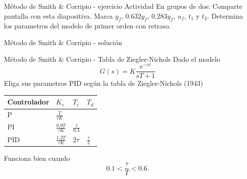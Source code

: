 \documentclass[presentation,aspectratio=1610]{beamer}
\begin{document}
\begin{frame}[label={sec:orgf203a01}]{Método de Smith \& Corripio - ejercicio}
\alert{Actividad} En grupos de dos: Comparte pantalla con esta diapositiva. Marca \(y_f\), \(0.632y_f\), \(0.283y_f\), \(u_f\), \(t_1\) y \(t_2\). Determina los parametros del modelo de primer orden con retraso.

\def\uampl{0.5}
\def\ttdelay{0.3}
\def\TTcnst{1.6}
\def\ggain{3}

\pgfmathsetmacro{\yfinal}{\uampl*\ggain}
\pgfmathsetmacro{\two}{\tdelay + \Tcnst}


\begin{center}
\end{center}
\end{frame}

\begin{frame}[label={sec:orgc81916a}]{Método de Smith \& Corripio - solución}
\end{frame}
\begin{frame}[label={sec:org71852b3}]{Método de Smith \& Corripio - Tabla de Ziegler-Nichols}
Dado el modelo 
\[ G(s) = K \frac{\mathrm{e}^{-s\tau}}{sT + 1} \]
Eliga sus parametros PID según la tabla de Ziegler-Nichols (1943)
   \begin{center}
   \setlength{\tabcolsep}{20pt}
   \renewcommand{\arraystretch}{1.5}
   \begin{tabular}{llll}
   Controlador & \(K_c\) & \(T_i\) & \(T_d\)\\
  \hline\hline
  P & \(\frac{T}{\tau K}\) &  & \\
  PI & \(\frac{0.9T}{\tau K}\) & \(\frac{\tau}{0.3}\) & \\
  PID & \(\frac{1.2T}{\tau K}\) & \(2\tau\) & \(\frac{\tau}{2}\)\\
  \hline
\end{tabular}
\end{center}

Funciona bien cuando \[0.1 < \frac{\tau}{T} < 0.6.\]
\end{frame}
\end{document}
